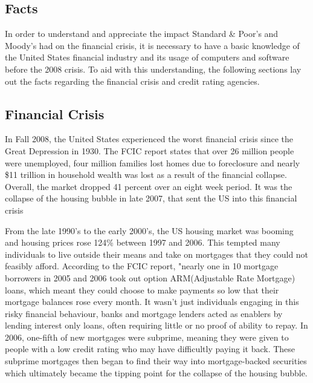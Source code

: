 \documentclass[11pt]{article}
\begin{document}
\newpage



\begin{multicols}{2}
\setcounter{page}{1}
\section{Facts}
In order to understand and appreciate the impact Standard \& Poor's and Moody's had on the financial crisis, it is necessary to have a basic knowledge of the United States financial industry and its usage of computers and software before the 2008 crisis.  To aid with this understanding, the following sections lay out the facts regarding the financial crisis and credit rating agencies.


\subsection{Financial Crisis}
In Fall 2008, the United States experienced the worst financial crisis since the Great Depression in 1930.  The FCIC report states that over 26 million people were unemployed, four million families lost homes due to foreclosure and nearly \$11 trillion in household wealth was lost as a result of the financial collapse.  \cite[p.~xv]{govtReport}  Overall, the market dropped 41 percent over an eight week period. \cite{marketWatch}  It was the collapse of the housing bubble in late 2007, that sent the US into this financial crisis


From the late 1990's to the early 2000's, the US housing market was booming and housing prices rose 124\% between 1997 and 2006. \cite{economistCreditCrunch}  This tempted many individuals to live outside their means and take on mortgages that they could not feasibly afford.  According to the FCIC report, "nearly one in 10 mortgage borrowers in 2005 and 2006 took out option ARM(Adjustable Rate Mortgage) loans, which meant they could choose to make payments so low that their mortgage balances rose every month. \cite[p.~xx]{govtReport} It wasn't just individuals engaging in this risky financial behaviour, banks and mortgage lenders acted as enablers by lending interest only loans, often requiring little or no proof of ability to repay. \cite[p.~xxiii]{govtReport}  In 2006, one-fifth of new mortgages were subprime, meaning they were given to people with a low credit rating who may have difficultly paying it back. \cite{economistCreditCrunch}  These subprime mortgages then began to find their way into mortgage-backed securities which ultimately became the tipping point for the collapse of the housing bubble.



\end{multicols}
\end{document}
